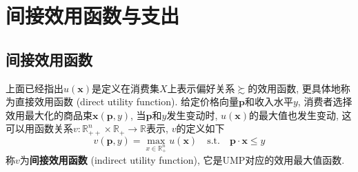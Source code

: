 \documentclass[cn, 12pt, math=mtpro2, bibstyle=apa, blue]{elegantbook}
\newcommand{\R}{\mathbb{R}}
\newcommand{\p}{\mathbf{p}}
\newcommand{\x}{\mathbf{x}}
\begin{document}
\section{间接效用函数与支出}
\subsection{间接效用函数}
上面已经指出$u(\x)$是定义在消费集$X$上表示偏好关系$\succsim$的效用函数, 更具体地称为直接效用函数 (direct utility function). 给定价格向量$\p$和收入水平$y$, 消费者选择效用最大化的商品束$\x(\p,y)$, 当$\p$和$y$发生变动时, $u(\x)$的最大值也发生变动, 这可以用函数关系$v:\R_{++}^n\times \R_+\to \R$表示, $v$的定义如下
\begin{equation}\label{eq1.11}
  v(\p,y)=\max_{x\in\R_+^n}u(\x)\quad\text{s.t.}\quad\p\cdot\x\leq y
\end{equation}
称$v$为\textbf{间接效用函数} (indirect utility function), 它是UMP对应的效用最大值函数.
\end{document}
